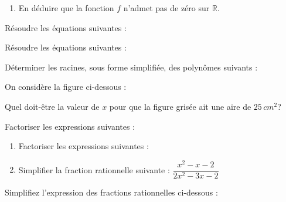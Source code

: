 \documentclass{book}
\begin{document}
\begin{multicols*}{2}
\begin{enumerate}
\begin{enumerate}
\item En d\'eduire que la fonction $f$ n'admet pas de z\'ero sur $\mathbb{R}$.
\end{enumerate}
\end{enumerate}

\leavevmode\exercice


R\'esoudre les \'equations suivantes :


\leavevmode\exercice


R\'esoudre les \'equations suivantes :


\leavevmode\exercice


D\'eterminer les racines, sous forme simplifi\'ee, des polyn\^omes suivants :


\leavevmode\exercice


On consid\`ere la figure ci-dessous :

\leavevmode\hfil\hbox{}

Quel doit-\^etre la valeur de $x$ pour que la figure gris\'ee ait une aire de $25\,cm^2$?

\leavevmode\exercice


Factoriser les expressions suivantes :


\leavevmode\exercice


\begin{enumerate}
\item Factoriser les expressions suivantes :


\item Simplifier la fraction rationnelle suivante :\newline
\hglue\leftmarginii$\dfrac{x^2-x-2}{2x^2-3x-2}$
\end{enumerate}

\leavevmode\exercice


Simplifiez l'expression des fractions rationnelles ci-dessous  :



\end{multicols*}
\end{document}
